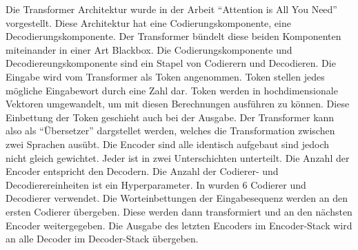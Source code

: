 \documentclass[
        ngerman,
        paper=a4,
        numbers=noendperiod,
]{scrreprt}
\begin{document}
Die Transformer Architektur wurde in der Arbeit  \enquote{Attention is All You Need} \citep{VaswaniAttentionNeed} vorgestellt. Diese Architektur hat eine Codierungskomponente, eine Decodierungskomponente. Der Transformer bündelt diese beiden Komponenten miteinander in einer Art Blackbox. Die Codierungskomponente und Decodiereungskomponente sind ein Stapel von Codierern und Decodieren. Die Eingabe wird vom Transformer als Token angenommen. Token stellen jedes mögliche Eingabewort durch eine Zahl dar. Token werden in hochdimensionale Vektoren umgewandelt, um mit diesen Berechnungen ausführen zu können. Diese Einbettung der Token geschieht auch bei der Ausgabe. Der Transformer kann also als \enquote{Übersetzer} dargstellet werden, welches  die Transformation zwischen zwei Sprachen ausübt. Die Encoder sind alle identisch aufgebaut sind jedoch nicht gleich gewichtet. Jeder ist in zwei Unterschichten unterteilt. Die Anzahl der Encoder entspricht den Decodern. Die Anzahl der Codierer- und Decodierereinheiten ist ein Hyperparameter. In \citep{VaswaniAttentionNeed} wurden 6 Codierer und Decodierer verwendet. Die Worteinbettungen der Eingabesequenz werden an den ersten Codierer übergeben. Diese werden dann transformiert und an den nächsten Encoder weitergegeben. Die Ausgabe des letzten Encoders im Encoder-Stack wird an alle Decoder im Decoder-Stack übergeben.








\end{document}
